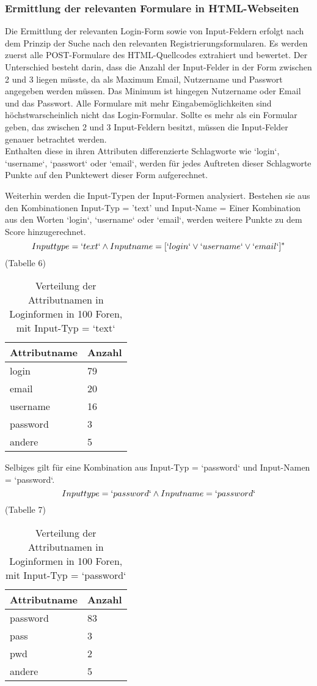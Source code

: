 \subsubsection{Ermittlung der relevanten Formulare in HTML-Webseiten}
Die Ermittlung der relevanten Login-Form sowie von Input-Feldern erfolgt nach dem Prinzip der Suche nach den relevanten Registrierungsformularen. Es werden zuerst alle POST-Formulare des HTML-Quellcodes extrahiert und bewertet. Der Unterschied besteht darin, dass die Anzahl der Input-Felder in der Form zwischen 2 und 3 liegen müsste, da als Maximum Email, Nutzername und Passwort angegeben werden müssen. Das Minimum ist hingegen Nutzername oder Email und das Passwort. Alle Formulare mit mehr Eingabemöglichkeiten sind höchstwarscheinlich nicht das Login-Formular.
Sollte es mehr als ein Formular geben, das zwischen 2 und 3 Input-Feldern besitzt, müssen die Input-Felder genauer betrachtet werden. \\
Enthalten diese in ihren Attributen differenzierte Schlagworte wie `login`, `username`, `passwort` oder `email`, werden für jedes Auftreten dieser Schlagworte Punkte auf den Punktewert dieser Form aufgerechnet.


Weiterhin werden die Input-Typen der Input-Formen analysiert. Bestehen sie aus den Kombinationen Input-Typ = 'text' und Input-Name = Einer Kombination aus den Worten `login`, `username` oder `email`, werden weitere Punkte zu dem Score hinzugerechnet.
\[Inputtype = `text` \wedge Inputname = [`login` \vee `username` \vee `email`]^*\] (Tabelle 6)

\begin{table}[h!]
\centering 
\begin{tabular}{ | p{3cm} | p{3cm}|} \hline
Attributname & Anzahl \\ \hline
login & 79 \\ \hline
email & 20 \\ \hline
username & 16 \\ \hline
password & 3 \\ \hline
andere & 5 \\ \hline
\end{tabular}
\caption{Verteilung der Attributnamen in Loginformen in 100 Foren, mit Input-Typ = `text`}
\end{table}



Selbiges gilt für eine Kombination aus Input-Typ = `password` und Input-Namen = `password`.
\[Inputtype = `password` \wedge Inputname = `password`\] (Tabelle 7)
\newpage
\begin{table}[h!]
\centering 
\begin{tabular}{ | p{3cm} | p{3cm}|} \hline
Attributname & Anzahl \\ \hline
password & 83 \\ \hline
pass & 3 \\ \hline
pwd & 2 \\ \hline
andere & 5 \\ \hline
\end{tabular}
\caption{Verteilung der Attributnamen in Loginformen in 100 Foren, mit Input-Typ = `password`}
\end{table}

